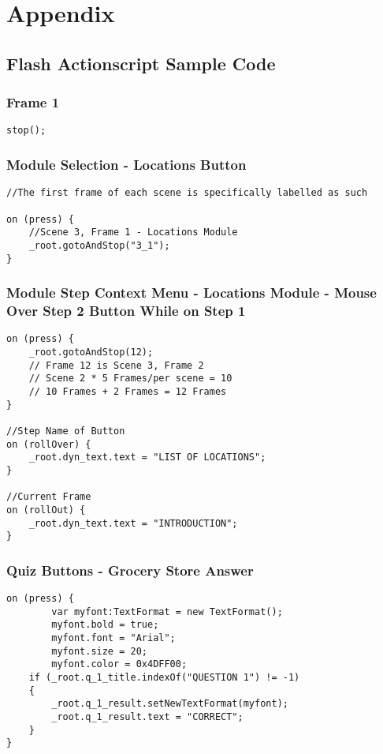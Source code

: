 \documentclass[12pt]{report}
\begin{document}
\chapter{Appendix}
\section{Flash Actionscript Sample Code}
\subsection{Frame 1}
\begin{verbatim}
stop();
\end{verbatim}
\subsection{Module Selection - Locations Button}
\begin{verbatim}
//The first frame of each scene is specifically labelled as such

on (press) {
	//Scene 3, Frame 1 - Locations Module
	_root.gotoAndStop("3_1");
}
\end{verbatim}
\subsection{Module Step Context Menu - Locations Module - Mouse Over Step 2 Button While on Step 1}
\begin{verbatim}
on (press) {
	_root.gotoAndStop(12); 
	// Frame 12 is Scene 3, Frame 2 
	// Scene 2 * 5 Frames/per scene = 10 
	// 10 Frames + 2 Frames = 12 Frames
}

//Step Name of Button
on (rollOver) {
	_root.dyn_text.text = "LIST OF LOCATIONS";
}

//Current Frame
on (rollOut) {
	_root.dyn_text.text = "INTRODUCTION";
}
\end{verbatim}
\subsection{Quiz Buttons - Grocery Store Answer}
\begin{verbatim}
on (press) {
		var myfont:TextFormat = new TextFormat();
		myfont.bold = true;
		myfont.font = "Arial";
		myfont.size = 20;
		myfont.color = 0x4DFF00;
	if (_root.q_1_title.indexOf("QUESTION 1") != -1)
	{
		_root.q_1_result.setNewTextFormat(myfont);
		_root.q_1_result.text = "CORRECT";
	}
}
\end{verbatim}
\end{document}
